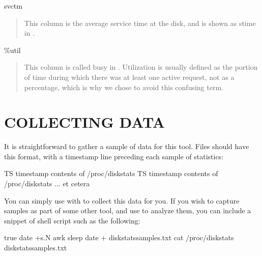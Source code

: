 \documentclass[letterpaper,10pt,english]{sphinxmanual}
\begin{document}
svctm
\begin{quote}

This column is the average service time at the disk, and is shown as stime in
.
\end{quote}

\%util
\begin{quote}

This column is called busy in .  Utilization is usually defined as
the portion of time during which there was at least one active request, not as a
percentage, which is why we chose to avoid this confusing term.
\end{quote}


\section{COLLECTING DATA}
\label{\detokenize{mariadb-iostat:collecting-data}}
It is straightforward to gather a sample of data for this tool.  Files should
have this format, with a timestamp line preceding each sample of statistics:

\begin{sphinxVerbatim}[commandchars=\\\{\}]
TS \PYGZlt{}timestamp\PYGZgt{}
\PYGZlt{}contents of /proc/diskstats\PYGZgt{}
TS \PYGZlt{}timestamp\PYGZgt{}
\PYGZlt{}contents of /proc/diskstats\PYGZgt{}
... et cetera
\end{sphinxVerbatim}

You can simply use  with {\hyperref[\detokenize{mariadb-iostat:cmdoption-mariadb-iostat-save-samples}]{}} to collect this data
for you.  If you wish to capture samples as part of some other tool, and use
 to analyze them, you can include a snippet of shell script such as
the following:

\begin{sphinxVerbatim}[commandchars=\\\{\}]
 true 
   date +\PYGZpc{}s.\PYGZpc{}N  awk 
   sleep 
   date + \PYGZgt{}\PYGZgt{} diskstats\PYGZhy{}samples.txt
   cat /proc/diskstats \PYGZgt{}\PYGZgt{} diskstats\PYGZhy{}samples.txt
\end{sphinxVerbatim}
\end{document}
